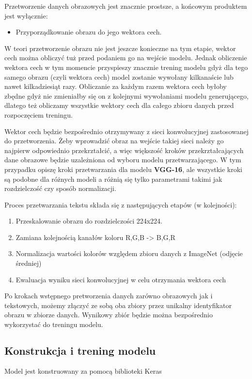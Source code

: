 
Przetworzenie danych obrazowych jest znacznie prostsze, a końcowym produktem jest wyłącznie:
\begin{itemize}
	\item Przyporządkowanie obrazu do jego wektora cech.
\end{itemize}
W teori przetworzenie obrazu nie jest jeszcze konieczne na tym etapie, wektor cech można obliczyć tuż przed podaniem go na wejście modelu. Jednak obliczenie wektora cech w tym momencie przyspieszy znacznie trening modelu gdyż dla tego samego obrazu (czyli wektora cech) model zostanie wywołany kilkanaście lub nawet kilkadziesiąt razy. Obliczanie za każdym razem wektora cech byłoby zbędne gdyż nie zmieniałby się on z kolejnymi wywołaniami modelu generującego, dlatego też obliczamy wszystkie wektory cech dla całego zbioru danych przed rozpoczęciem treningu.

Wektor cech będzie bezpośrednio otrzymywany z sieci konwolucyjnej zastosowanej do przetworzenia. Żeby wprowadzić obraz na wejście takiej sieci należy go najpierw odpowiednio przekrztałcić, a więc większość kroków przekrztałcających dane obrazowe będzie uzależniona od wyboru modelu przetwarzającego. W tym przypadku opiszę kroki przetwarzania dla modelu \textbf{VGG-16}, ale wszystkie kroki są podobne dla różnych modeli a różnią się tylko parametrami takimi jak rozdzielczość czy sposób normalizacji.

Proces przetwarzania tekstu składa się z następujących etapów (w kolejności):
\begin{enumerate}
	\item Przeskalowanie obrazu do rozdzielczości 224x224.
	\item Zamiana kolejnością kanałów koloru {R,G,B} -> {B,G,R}
	\item Normalizacja wartości kolorów względem zbioru danych z ImageNet (odjęcie średniej)
	\item Ewaluacja wyniku sieci konwolucyjnej w celu otrzymania wektora cech
\end{enumerate}

Po krokach wstępnego pretworzenia danych zarówno obrazowych jak i tekstowych, możemy złączyć ze sobą oba zbiory przez unikalny identyfikator obrazu w zbiorze danych. Wynikowy zbiór będzie można bezpośrednio wykorzystać do treningu modelu.

\subsection{Konstrukcja i trening modelu}
Model jest konstruowany za pomocą biblioteki Keras
